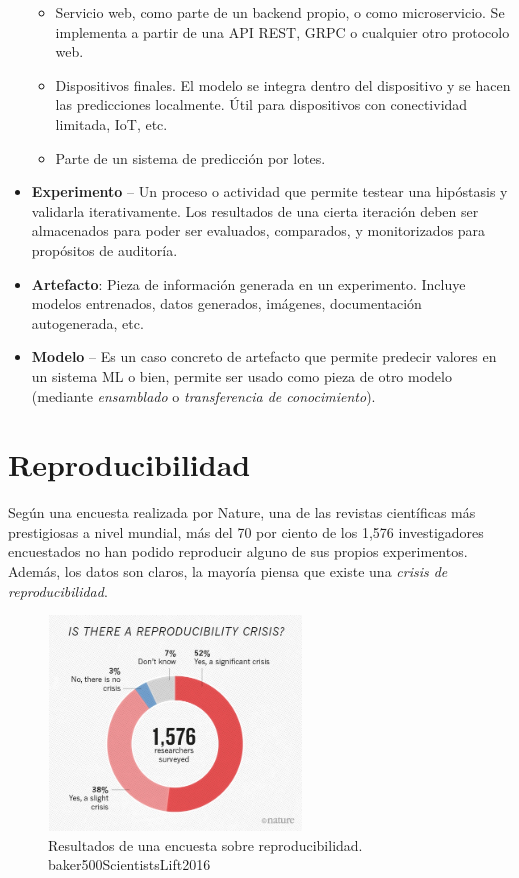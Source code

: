 \documentclass[
  12pt,
  a4paperpaper,
]{report}
\providecommand{\tightlist}{%
  \setlength{\itemsep}{0pt}\setlength{\parskip}{0pt}}
\begin{document}
\begin{itemize}
  \begin{itemize}
  \tightlist
  \item
    Servicio web, como parte de un backend propio, o como microservicio.
    Se implementa a partir de una API REST, GRPC o cualquier otro
    protocolo web.
  \item
    Dispositivos finales. El modelo se integra dentro del dispositivo y
    se hacen las predicciones localmente. Útil para dispositivos con
    conectividad limitada, IoT, etc.
  \item
    Parte de un sistema de predicción por lotes.
  \end{itemize}
\item
  \textbf{Experimento} -- Un proceso o actividad que permite testear una
  hipóstasis y validarla iterativamente. Los resultados de una cierta
  iteración deben ser almacenados para poder ser evaluados, comparados,
  y monitorizados para propósitos de auditoría.
\item
  \textbf{Artefacto}: Pieza de información generada en un experimento.
  Incluye modelos entrenados, datos generados, imágenes, documentación
  autogenerada, etc.
\item
  \textbf{Modelo} -- Es un caso concreto de artefacto que permite
  predecir valores en un sistema ML o bien, permite ser usado como pieza
  de otro modelo (mediante \emph{ensamblado} o \emph{transferencia de
  conocimiento}).
\end{itemize}

\hypertarget{reproducibilidad}{%
\section{Reproducibilidad}\label{reproducibilidad}}

Según una encuesta realizada por Nature, una de las revistas científicas
más prestigiosas a nivel mundial, más del 70 por ciento de los 1,576
investigadores encuestados no han podido reproducir alguno de sus
propios experimentos. Además, los datos son claros, la mayoría piensa
que existe una \emph{crisis de reproducibilidad}.

\begin{figure}
\centering
\includegraphics[width=0.6\textwidth,height=\textheight]{source/figures/nature_survey.jpeg}
\caption{Resultados de una encuesta sobre reproducibilidad.
baker500ScientistsLift2016}
\end{figure}
\end{document}
